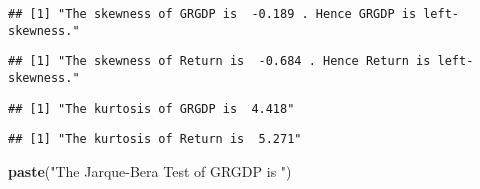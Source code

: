\documentclass[]{article}
\newenvironment{Shaded}{\begin{snugshade}}{\end{snugshade}}
\newcommand{\KeywordTok}[1]{\textcolor[rgb]{0.13,0.29,0.53}{\textbf{#1}}}
\newcommand{\DecValTok}[1]{\textcolor[rgb]{0.00,0.00,0.81}{#1}}
\newcommand{\StringTok}[1]{\textcolor[rgb]{0.31,0.60,0.02}{#1}}
\newcommand{\OperatorTok}[1]{\textcolor[rgb]{0.81,0.36,0.00}{\textbf{#1}}}
\newcommand{\NormalTok}[1]{#1}
\begin{document}
\begin{verbatim}
## [1] "The skewness of GRGDP is  -0.189 . Hence GRGDP is left-skewness."
\end{verbatim}

\begin{Shaded}
\end{Shaded}

\begin{verbatim}
## [1] "The skewness of Return is  -0.684 . Hence Return is left-skewness."
\end{verbatim}

\begin{Shaded}
\end{Shaded}

\begin{verbatim}
## [1] "The kurtosis of GRGDP is  4.418"
\end{verbatim}

\begin{Shaded}
\end{Shaded}

\begin{verbatim}
## [1] "The kurtosis of Return is  5.271"
\end{verbatim}

\begin{Shaded}
\begin{Highlighting}[]
\KeywordTok{paste}\NormalTok{(}\StringTok{"The Jarque-Bera Test of GRGDP is "}\NormalTok{)}
\end{Highlighting}
\end{Shaded}
\end{document}
